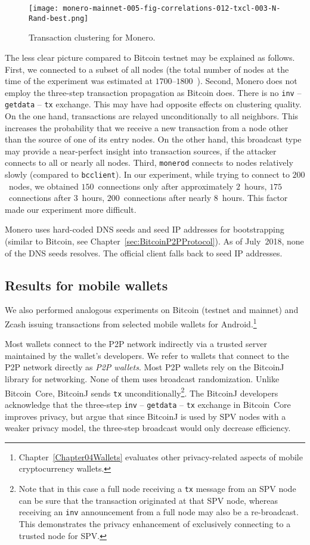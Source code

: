 \begin{figure}[!t]
	\centering
	\texttt{[image: monero-mainnet-005-fig-correlations-012-txcl-003-N-Rand-best.png]}
	\caption{Transaction clustering for Monero.}
	\label{fig:monero}
\end{figure}

The less clear picture compared to Bitcoin testnet may be explained as follows.
First, we connected to a subset of all nodes (the total number of nodes at the time of the experiment was estimated at $1700$--$1800$~\cite{MoneroHash}).
Second, Monero does not employ the three-step transaction propagation as Bitcoin does.
There is no \texttt{inv} -- \texttt{getdata} -- \texttt{tx} exchange.
This may have had opposite effects on clustering quality.
On the one hand, transactions are relayed unconditionally to all neighbors.
This increases the probability that we receive a new transaction from a node other than the source of one of its entry nodes.
On the other hand, this broadcast type may provide a near-perfect insight into transaction sources, if the attacker connects to all or nearly all nodes.
Third, \texttt{monerod} connects to nodes relatively slowly (compared to \texttt{bcclient}).
In our experiment, while trying to connect to $200$~nodes, we obtained $150$~connections only after approximately $2$~hours, $175$~connections after $3$~hours, $200$~connections after nearly $8$~hours.
This factor made our experiment more difficult.

Monero uses hard-coded DNS seeds and seed IP addresses for bootstrapping (similar to Bitcoin, see Chapter~\ref{sec:BitcoinP2PProtocol}).
As of July~2018, none of the DNS seeds resolves.
The official client falls back to seed IP addresses.


\subsection{Results for mobile wallets}

We also performed analogous experiments on Bitcoin (testnet and mainnet) and Zcash issuing transactions from selected mobile wallets for Android.\footnote{Chapter~\ref{Chapter04Wallets} evaluates other privacy-related aspects of mobile cryptocurrency wallets.}

Most wallets connect to the P2P network indirectly via a trusted server maintained by the wallet's developers.
We refer to wallets that connect to the P2P network directly as \textit{P2P wallets}.
Most P2P wallets rely on the BitcoinJ library for networking.
None of them uses broadcast randomization.
Unlike Bitcoin~Core, BitcoinJ sends \texttt{tx} unconditionally\footnote{Note that in this case a full node receiving a \texttt{tx} message from an SPV node can be sure that the transaction originated at that SPV node, whereas receiving an \texttt{inv} announcement from a full node may also be a re-broadcast. This demonstrates the privacy enhancement of exclusively connecting to a trusted node for SPV.}.
The BitcoinJ developers acknowledge that the three-step \texttt{inv} -- \texttt{getdata} -- \texttt{tx} exchange in Bitcoin~Core improves privacy, but argue that since BitcoinJ is used by SPV nodes with a weaker privacy model, the three-step broadcast would only decrease efficiency.

